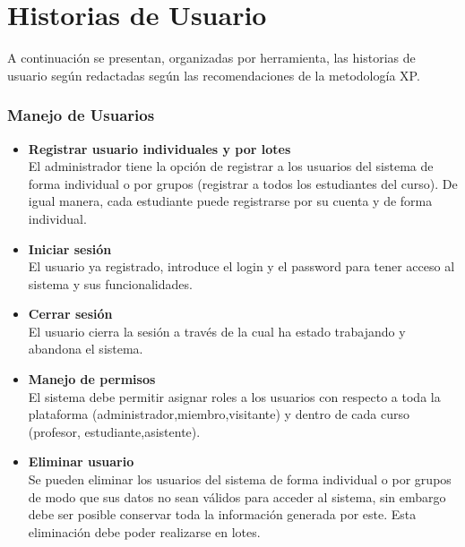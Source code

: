 \section{Historias de Usuario}
A continuación se presentan, organizadas por herramienta, las historias de usuario según redactadas según las recomendaciones de la metodología XP.

\subsubsection{Manejo de Usuarios}
\begin{itemize}
	\item \textbf{Registrar usuario individuales y por lotes}\\
	El administrador tiene la opción de registrar a los usuarios del sistema de forma individual o por grupos (registrar a todos los estudiantes del curso). De igual manera, cada estudiante puede registrarse por su cuenta y de forma individual.
	\item \textbf{Iniciar sesión}\\
	El usuario ya registrado, introduce el login y el password para tener acceso al sistema y sus funcionalidades.
	\item \textbf{Cerrar sesión}\\
	El usuario cierra la sesión a través de la cual ha estado trabajando y abandona el sistema.
	\item \textbf{Manejo de permisos}\\
	El sistema debe permitir asignar roles a los usuarios con respecto a toda la plataforma (administrador,miembro,visitante) y dentro de cada curso (profesor, estudiante,asistente).
	\item \textbf{Eliminar usuario}\\
	Se pueden eliminar los usuarios del sistema de forma individual o por grupos de modo que sus datos no sean válidos para acceder al sistema, sin embargo debe ser posible conservar toda la información generada por este. Esta eliminación debe poder realizarse en lotes.
\end{itemize}

